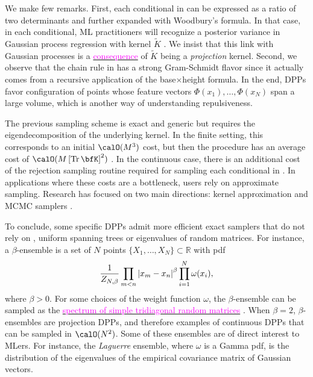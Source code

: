 \documentclass[twoside,11pt]{article}
\begin{document}
      We make few remarks.
      First, each conditional in  can be expressed as a ratio of two determinants and further expanded with Woodbury's formula.
      In that case, in each conditional, ML practitioners will recognize  a posterior variance in Gaussian process regression with kernel $\tilde K$ \cite[Equation 2.26]{RaWi06}.
      We insist that this link with Gaussian processes is a \href{https://dppy.readthedocs.io/en/latest/finite_dpps/exact_sampling.html#caution}{\textcolor{magenta}{consequence}} of $\tilde K$ being a \emph{projection} kernel.
      Second, we observe that the chain rule in  has a strong Gram-Schmidt flavor since it actually comes from a recursive application of the base$\times$height formula.
      In the end, DPPs favor configuration of points whose feature vectors $\Phi(x_1),\dots, \Phi(x_N)$ span a large volume, which is another way of understanding repulsiveness.

      The previous sampling scheme is exact and generic but requires the eigendecomposition of the underlying kernel.
      In the finite setting, this corresponds to an initial $\calO(M^3)$ cost, but then the procedure has an average cost of $\calO(M\lrb{\Tr \bfK}^2)$
      \citep{TrBaAm18}.
      In the continuous case, there is an additional cost of the rejection sampling routine required for sampling each conditional in .
      In applications where these costs are a bottleneck, users rely on approximate sampling.
      Research has focused on two main directions: kernel approximation \citep{AKFT13} and MCMC samplers \citep{AnGhRe16, LiJeSr16c, GaBaVa17}.

      To conclude, some specific DPPs admit more efficient exact samplers that do not rely on , \eg uniform spanning trees \citep{PrWi98} or eigenvalues of random matrices.
      For instance, a $\beta$-ensemble is a set of $N$ points $\{X_1,\dots,X_N\}\subset\mathbb{R}$ with pdf
      \begin{equation*}
        \frac{1}{Z_{N,\beta}}
        \prod_{m< n}
          \left| x_m-x_n \right|^{\beta}
        \prod_{i= 1}^N
          \omega(x_i),
      \end{equation*}
      where $\beta>0$.
      For some choices of the weight function $\omega$, the $\beta$-ensemble can be sampled as the \href{https://dppy.readthedocs.io/en/latest/continuous_dpps/beta_ensembles.banded_models.html}{\textcolor{magenta}{spectrum of simple tridiagonal random matrices}} \citep{DuEd02,KiNe04}.
      When $\beta=2$, $\beta$-ensembles are projection DPPs, and therefore examples of continuous DPPs that can be sampled in $\calO(N^2)$.
      Some of these ensembles are of direct interest to MLers.
      For instance, the \emph{Laguerre} ensemble, where $\omega$ is a Gamma pdf, is the distribution of the eigenvalues of the empirical covariance matrix of \iid Gaussian vectors.
\end{document}
